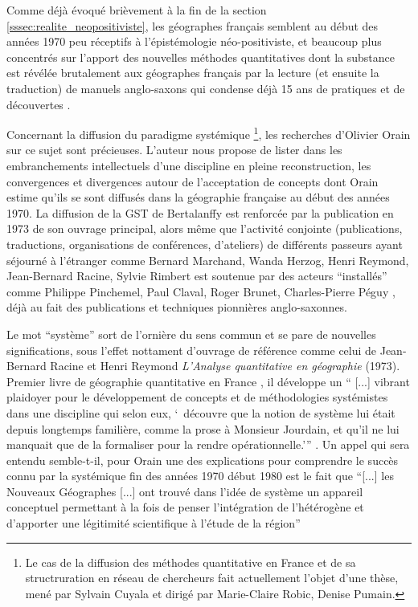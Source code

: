 
Comme déjà évoqué brièvement à la fin de la section \ref{sssec:realite_neopositiviste}, les géographes français semblent au début des années 1970 peu réceptifs à l'épistémologie néo-positiviste, et beaucoup plus concentrés sur l'apport des nouvelles méthodes quantitatives dont la substance est révélée brutalement aux géographes français par la lecture (et ensuite la traduction) de manuels anglo-saxons qui condense déjà 15 ans de pratiques et de découvertes \autocite[129]{Pumain2002}.

Concernant la diffusion du paradigme systémique \footnote{Le cas de la diffusion des méthodes quantitative en France et de sa structruration en réseau de chercheurs fait actuellement l'objet d'une thèse, mené par Sylvain Cuyala et dirigé par Marie-Claire Robic, Denise Pumain.}, les recherches d'Olivier Orain \autocite{Orain2001} sur ce sujet sont précieuses. L'auteur nous propose de lister dans les embranchements intellectuels d'une discipline en pleine reconstruction, les convergences et divergences autour de l'acceptation de concepts dont Orain estime qu'ils se sont diffusés dans la géographie française au début des années 1970. La diffusion de la GST de Bertalanffy est renforcée par la publication en 1973 de son ouvrage principal, alors même que l'activité conjointe (publications, traductions, organisations de conférences, d'ateliers) de différents passeurs ayant séjourné à l'étranger comme Bernard Marchand, Wanda Herzog, Henri Reymond, Jean-Bernard Racine, Sylvie Rimbert est soutenue par des acteurs \enquote{installés} comme Philippe Pinchemel, Paul Claval, Roger Brunet, Charles-Pierre Péguy \autocite{Pumain2002,Cauvin2007}, déjà au fait des publications et techniques pionnières anglo-saxonnes.

Le mot \enquote{système} sort de l'ornière du sens commun et se pare de nouvelles significations, sous l'effet nottament d'ouvrage de référence comme celui de Jean-Bernard Racine et Henri Reymond  \textit{L’Analyse quantitative en géographie} (1973). Premier livre de géographie quantitative en France \autocite{Cauvin2007}, il développe un \enquote{ [...] vibrant plaidoyer pour le développement de concepts et de méthodologies systémistes dans une discipline qui selon eux, \enquote{ découvre que la notion de système lui était depuis longtemps familière, comme la prose à Monsieur Jourdain, et qu'il ne lui manquait que de la formaliser pour la rendre opérationnelle.}} \textcite{Orain2001}. Un appel qui sera entendu semble-t-il, pour Orain \autocite[23]{Orain2001} une des explications pour comprendre le succès connu par la systémique fin des années 1970 début 1980 est le fait que \enquote{[...] les Nouveaux Géographes [...] ont trouvé dans l’idée de système un appareil conceptuel permettant à la fois de penser l’intégration de l’hétérogène et d’apporter une légitimité scientifique à l’étude de la région}


